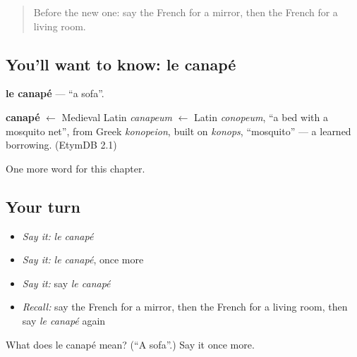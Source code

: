 \label{lesson:FR-C75-canape}



\begin{quote}
Before the new one: say the French for a mirror, then the French for a living room.
\end{quote}

\subsection*{You'll want to know: le canapé}
\textbf{le canapé} — \textquotedblleft{}a sofa\textquotedblright{}.

\begin{cousinweb}
\textbf{canapé} $\leftarrow$ Medieval Latin \emph{canapeum} $\leftarrow$ Latin \emph{conopeum}, \textquotedblleft{}a bed with a mosquito net\textquotedblright{}, from Greek \emph{konopeion}, built on \emph{konops}, \textquotedblleft{}mosquito\textquotedblright{} — a learned borrowing. (EtymDB 2.1)
\end{cousinweb}

\begin{grammarlens}[title={What you've built}]
One more word for this chapter.
\end{grammarlens}

\subsection*{Your turn}
\begin{itemize}
\raggedright
  \item \emph{Say it:} \emph{le canapé}
  \item \emph{Say it:} \emph{le canapé}, once more
  \item \emph{Say it:} say \emph{le canapé}
  \item \emph{Recall:} say the French for a mirror, then the French for a living room, then say \emph{le canapé} again
\end{itemize}

\begin{tcolorbox}[breakable,colback=teal!4,colframe=teal!35!black,title={Before you move on}]
What does le canapé mean? (\textquotedblleft{}A sofa\textquotedblright{}.) Say it once more.
\end{tcolorbox}
